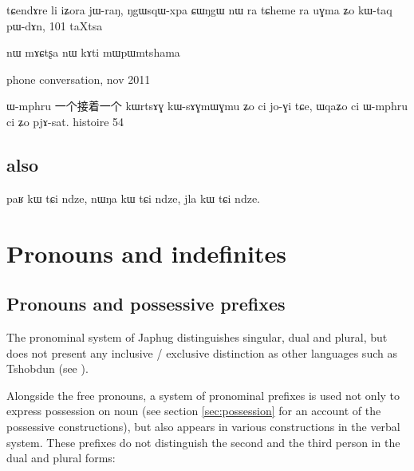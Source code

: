 \documentclass[oldfontcommands,oneside,a4paper,11pt]{memoir}
\newcommand{\wav}[1]{}%
\begin{document}
tɕendɤre	li	iʑora	jɯ-raŋ,	ŋgɯsqɯ-xpa	ɕɯŋgɯ	nɯ	ra	tɕheme	ra	uɣma	ʑo	kɯ-taq	pɯ-dɤn,
101 taXtsa



nɯ mɤɕtʂa nɯ kɤti mɯpɯmtshama
\wav{8_nWmACtsxa}
phone conversation, nov 2011


ɯ-mphru 一个接着一个
kɯrtsɤɣ kɯ-sɤɣmɯɣmu ʑo ci jo-ɣi tɕe, ɯqaʑo ci ɯ-mphru ci ʑo pjɤ-sat.
histoire 54

\section{also}

paʁ kɯ tɕi ndze, nɯŋa kɯ tɕi ndze, jla kɯ tɕi ndze.


\chapter{Pronouns and indefinites}
\section{Pronouns and possessive prefixes} \label{sec:pronouns}

The pronominal system of Japhug distinguishes singular, dual and plural, but does not present any inclusive / exclusive distinction as other languages such as Tshobdun (see \citealt{jackson98morphology}).


Alongside the free pronouns, a system of pronominal prefixes is used not only to express  possession on noun (see section \ref{sec:possession}  for an account of the possessive constructions), but also appears in various constructions in the verbal system. These prefixes do not distinguish the second and the third person in the dual and plural forms:
\end{document}
